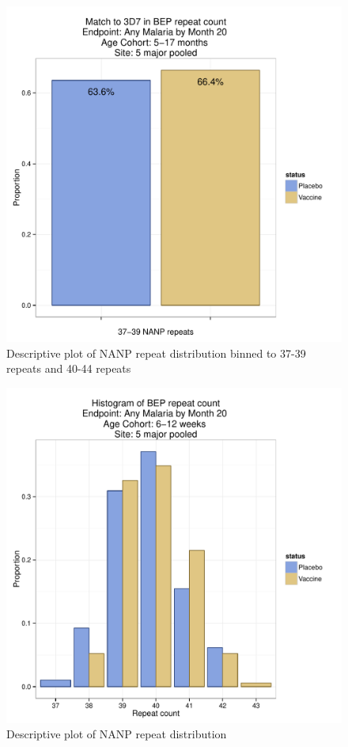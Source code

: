 \documentclass[]{article}
\begin{document}
\begin{figure}[htbp]
\centering
\includegraphics{figures/bep-cat-infact-x-1.pdf}
\caption{Descriptive plot of NANP repeat distribution binned to 37-39
repeats and 40-44 repeats}
\end{figure}

\begin{figure}[htbp]
\centering
\includegraphics{figures/bep-hist-newborn-x-1.pdf}
\caption{Descriptive plot of NANP repeat distribution}
\end{figure}
\end{document}
